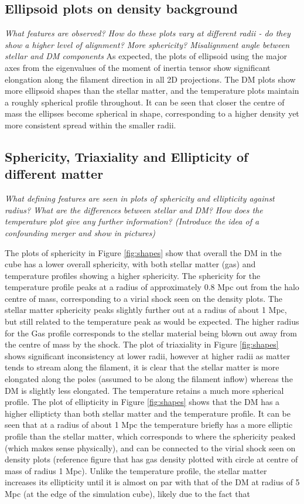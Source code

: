 \documentclass[journal]{IEEEtran}
\begin{document}
\subsection{Ellipsoid plots on density background}
\textit{What features are observed? How do these plots vary at different radii - do they show a higher level of alignment? More sphericity? 
Misalignment angle between stellar and DM components}
As expected, the plots of ellipsoid using the major axes from the eigenvalues of the moment of inertia tensor show significant elongation along the filament direction in all 2D projections. The DM plots show more ellipsoid shapes than the stellar matter, and the temperature plots maintain a roughly spherical profile throughout. It can be seen that closer the centre of mass the ellipses become spherical in shape, corresponding to a higher density yet more consistent spread within the smaller radii. 

\subsection{Sphericity, Triaxiality and Ellipticity of different matter}
\textit{What defining features are seen in plots of sphericity and ellipticity against radius? What are the differences between stellar and DM? How does the temperature plot give any further information?
(Introduce the idea of a confounding merger and show in pictures)}

The plots of sphericity in Figure \ref{fig:shapes} show that overall the DM in the cube has a lower overall sphericity, with both stellar matter (gas) and temperature profiles showing a higher sphericity. The sphericity for the temperature profile peaks at a radius of approximately 0.8 Mpc out from the halo centre of mass, corresponding to a virial shock seen on the density plots. The stellar matter sphericity peaks slightly further out at a radius of about 1 Mpc, but still related to the temperature peak as would be expected. The higher radius for the Gas profile corresponds to the stellar material being blown out away from the centre of mass by the shock. 
The plot of triaxiality in Figure \ref{fig:shapes} shows significant inconsistency at lower radii, however at higher radii as matter tends to stream along the filament, it is clear that the stellar matter is more elongated along the poles (assumed to be along the filament inflow) whereas the DM is slightly less elongated. The temperature retains a much more spherical profile.
The plot of ellipticity in Figure \ref{fig:shapes} shows that the DM has a higher ellipticty than both stellar matter and the temperature profile. It can be seen that at a radius of about 1 Mpc the temperature briefly has a more elliptic profile than the stellar matter, which corresponds to where the sphericity peaked (which makes sense physically), and can be connected to the virial shock seen on density plots (reference figure that has gas density plotted with circle at centre of mass of radius 1 Mpc). Unlike the temperature profile, the stellar matter increases its ellipticity until it is almost on par with that of the DM at radius of 5 Mpc (at the edge of the simulation cube), likely due to the fact that 
\end{document}
